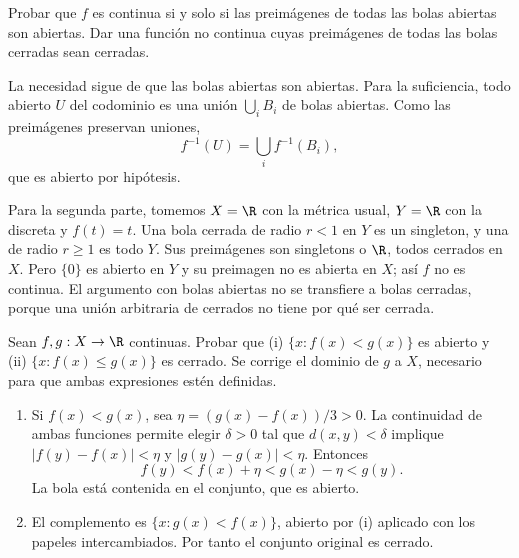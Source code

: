 \begin{ejercicio}
Probar que $f$ es continua si y solo si las preimágenes de todas las bolas abiertas son abiertas. Dar una función no continua cuyas preimágenes de todas las bolas cerradas sean cerradas.
\end{ejercicio}
\begin{solucion}
La necesidad sigue de que las bolas abiertas son abiertas. Para la suficiencia, todo abierto $U$ del codominio es una unión $\bigcup_iB_i$ de bolas abiertas. Como las preimágenes preservan uniones,
\[
f^{-1}(U)=\bigcup_i f^{-1}(B_i),
\]
que es abierto por hipótesis.

Para la segunda parte, tomemos $X=\R$ con la métrica usual, $Y=\R$ con la discreta y $f(t)=t$. Una bola cerrada de radio $r<1$ en $Y$ es un singleton, y una de radio $r\ge1$ es todo $Y$. Sus preimágenes son singletons o $\R$, todos cerrados en $X$. Pero $\{0\}$ es abierto en $Y$ y su preimagen no es abierta en $X$; así $f$ no es continua. El argumento con bolas abiertas no se transfiere a bolas cerradas, porque una unión arbitraria de cerrados no tiene por qué ser cerrada.
\end{solucion}

\begin{ejercicio}
Sean $f,g:X\to\R$ continuas. Probar que (i) $\{x:f(x)<g(x)\}$ es abierto y (ii) $\{x:f(x)\le g(x)\}$ es cerrado. Se corrige el dominio de $g$ a $X$, necesario para que ambas expresiones estén definidas.
\end{ejercicio}
\begin{solucion}
\begin{enumerate}[label=(\roman*)]
\item Si $f(x)<g(x)$, sea $\eta=(g(x)-f(x))/3>0$. La continuidad de ambas funciones permite elegir $\delta>0$ tal que $d(x,y)<\delta$ implique $|f(y)-f(x)|<\eta$ y $|g(y)-g(x)|<\eta$. Entonces
\[
f(y)<f(x)+\eta<g(x)-\eta<g(y).
\]
La bola está contenida en el conjunto, que es abierto.
\item El complemento es $\{x:g(x)<f(x)\}$, abierto por (i) aplicado con los papeles intercambiados. Por tanto el conjunto original es cerrado.
\end{enumerate}
\end{solucion}

